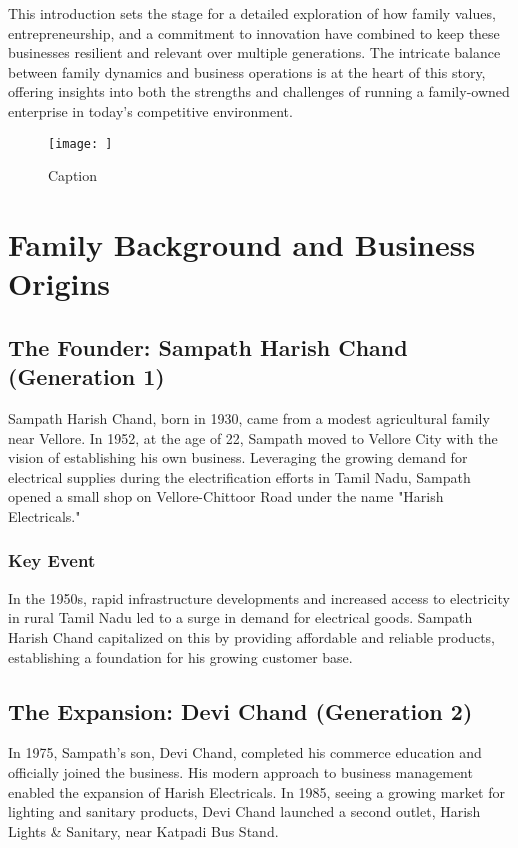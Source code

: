 \documentclass[a4paper,12pt]{report}
\begin{document}
This introduction sets the stage for a detailed exploration of how family values, entrepreneurship, and a commitment to innovation have combined to keep these businesses resilient and relevant over multiple generations. The intricate balance between family dynamics and business operations is at the heart of this story, offering insights into both the strengths and challenges of running a family-owned enterprise in today’s competitive environment.



\begin{figure}
    \centering
    \texttt{[image: ]}
    \caption{Caption}
    \label{fig:enter-label}
\end{figure}

\chapter{Family Background and Business Origins}

\section{The Founder: Sampath Harish Chand (Generation 1)}
Sampath Harish Chand, born in 1930, came from a modest agricultural family near Vellore. In 1952, at the age of 22, Sampath moved to Vellore City with the vision of establishing his own business. Leveraging the growing demand for electrical supplies during the electrification efforts in Tamil Nadu, Sampath opened a small shop on Vellore-Chittoor Road under the name "Harish Electricals."

\subsection{Key Event}
In the 1950s, rapid infrastructure developments and increased access to electricity in rural Tamil Nadu led to a surge in demand for electrical goods. Sampath Harish Chand capitalized on this by providing affordable and reliable products, establishing a foundation for his growing customer base.

\section{The Expansion: Devi Chand (Generation 2)}
In 1975, Sampath's son, Devi Chand, completed his commerce education and officially joined the business. His modern approach to business management enabled the expansion of Harish Electricals. In 1985, seeing a growing market for lighting and sanitary products, Devi Chand launched a second outlet, Harish Lights \& Sanitary, near Katpadi Bus Stand.
\end{document}
